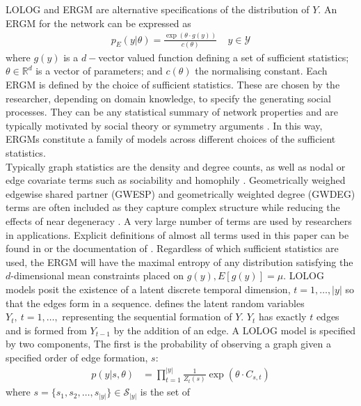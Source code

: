 \documentclass[
]{statsoc}
\begin{document}
LOLOG and ERGM are alternative specifications of the distribution of
\(Y\). An ERGM for the network can be expressed as
\begin{align}\label{eq:ERGM_spec}
p_{E}(y\vert \theta) = \frac{\exp(\theta\cdot g(y))}{c({\theta})}~~~~~ y\in \mathscr{Y}
\end{align} \noindent where \(g(y)\) is a \(d-\)vector valued function
defining a set of sufficient statistics; \(\theta \in \mathds{R}^{d}\)
is a vector of parameters; and \(c(\theta)\) the normalising constant.
Each ERGM is defined by the choice of sufficient statistics. These are
chosen by the researcher, depending on domain knowledge, to specify the
generating social processes. They can be any statistical summary of
network properties and are typically motivated by social theory
\citep{goodkittsmorris09} or symmetry arguments \citep{str86}. In this
way, ERGMs constitute a family of models across different choices of the
sufficient statistics.\\
Typically graph statistics are the density and degree counts, as well as
nodal or edge covariate terms such as sociability and homophily
\citep{ergmtermsjss}. Geometrically weighed edgewise shared partner
(GWESP) and geometrically weighted degree (GWDEG) terms are often
included \citep{snijders2006} as they capture complex structure while
reducing the effects of near degeneracy \citep{Handcock2003}. A very
large number of terms are used by researchers in applications. Explicit
definitions of almost all terms used in this paper can be found in
\cite{ergmtermsjss} or the documentation of \cite{ergm_3_9_4}.
Regardless of which sufficient statistics are used, the ERGM will have
the maximal entropy of any distribution satisfying the \(d\)-dimensional
mean constraints placed on \(g(y), E[g(y)]=\mu\). LOLOG models posit the
existence of a latent discrete temporal dimension, \(t=1, \ldots, |y|\)
so that the edges form in a sequence. \cite{Fellows2018} defines the
latent random variables \(Y_{t},\ t=1, \ldots,\) representing the
sequential formation of \(Y\). \(Y_{t}\) has exactly \(t\) edges and is
formed from \(Y_{t-1}\) by the addition of an edge. A LOLOG model is
specified by two components, The first is the probability of observing a
graph given a specified order of edge formation, \(s\): \begin{align}
p(y \vert s,\theta) &= \prod_{t=1}^{|y|} \frac{1}{Z_t(s)} \exp\left(\theta\cdot C_{s,t}\right)
\end{align} \noindent where
\(s=\{s_1, s_2, \ldots, s_{|y|}\} \in \mathscr{S}_{|y|}\) is the set of
\end{document}
